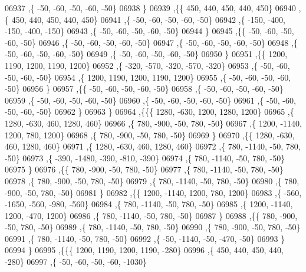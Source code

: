 \begin{DoxyCode}
06937     ,\{   -50,   -60,   -50,   -60,   -50\}
06938     \}
06939    ,\{\{   450,   440,   450,   440,   450\}
06940     ,\{   450,   440,   450,   440,   450\}
06941     ,\{   -50,   -60,   -50,   -60,   -50\}
06942     ,\{  -150,  -400,  -150,  -400,  -150\}
06943     ,\{   -50,   -60,   -50,   -60,   -50\}
06944     \}
06945    ,\{\{   -50,   -60,   -50,   -60,   -50\}
06946     ,\{   -50,   -60,   -50,   -60,   -50\}
06947     ,\{   -50,   -60,   -50,   -60,   -50\}
06948     ,\{   -50,   -60,   -50,   -60,   -50\}
06949     ,\{   -50,   -60,   -50,   -60,   -50\}
06950     \}
06951    ,\{\{  1200,  1190,  1200,  1190,  1200\}
06952     ,\{  -320,  -570,  -320,  -570,  -320\}
06953     ,\{   -50,   -60,   -50,   -60,   -50\}
06954     ,\{  1200,  1190,  1200,  1190,  1200\}
06955     ,\{   -50,   -60,   -50,   -60,   -50\}
06956     \}
06957    ,\{\{   -50,   -60,   -50,   -60,   -50\}
06958     ,\{   -50,   -60,   -50,   -60,   -50\}
06959     ,\{   -50,   -60,   -50,   -60,   -50\}
06960     ,\{   -50,   -60,   -50,   -60,   -50\}
06961     ,\{   -50,   -60,   -50,   -60,   -50\}
06962     \}
06963    \}
06964   ,\{\{\{  1280,  -630,  1200,  1280,  1200\}
06965     ,\{  1280,  -630,   460,  1280,   460\}
06966     ,\{   780,  -900,   -50,   780,   -50\}
06967     ,\{  1200, -1140,  1200,   780,  1200\}
06968     ,\{   780,  -900,   -50,   780,   -50\}
06969     \}
06970    ,\{\{  1280,  -630,   460,  1280,   460\}
06971     ,\{  1280,  -630,   460,  1280,   460\}
06972     ,\{   780, -1140,   -50,   780,   -50\}
06973     ,\{  -390, -1480,  -390,  -810,  -390\}
06974     ,\{   780, -1140,   -50,   780,   -50\}
06975     \}
06976    ,\{\{   780,  -900,   -50,   780,   -50\}
06977     ,\{   780, -1140,   -50,   780,   -50\}
06978     ,\{   780,  -900,   -50,   780,   -50\}
06979     ,\{   780, -1140,   -50,   780,   -50\}
06980     ,\{   780,  -900,   -50,   780,   -50\}
06981     \}
06982    ,\{\{  1200, -1140,  1200,   780,  1200\}
06983     ,\{  -560, -1650,  -560,  -980,  -560\}
06984     ,\{   780, -1140,   -50,   780,   -50\}
06985     ,\{  1200, -1140,  1200,  -470,  1200\}
06986     ,\{   780, -1140,   -50,   780,   -50\}
06987     \}
06988    ,\{\{   780,  -900,   -50,   780,   -50\}
06989     ,\{   780, -1140,   -50,   780,   -50\}
06990     ,\{   780,  -900,   -50,   780,   -50\}
06991     ,\{   780, -1140,   -50,   780,   -50\}
06992     ,\{   -50, -1140,   -50,  -470,   -50\}
06993     \}
06994    \}
06995   ,\{\{\{  1200,  1190,  1200,  1190,  -280\}
06996     ,\{   450,   440,   450,   440,  -280\}
06997     ,\{   -50,   -60,   -50,   -60, -1030\}

\end{DoxyCode}

